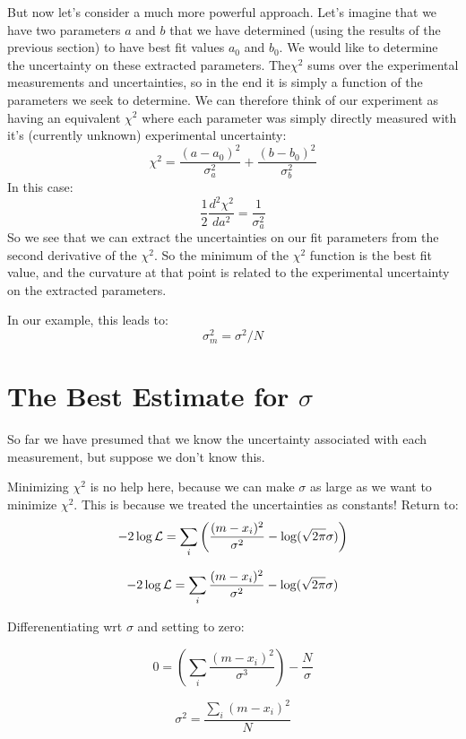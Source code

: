 \documentclass[12pt]{article}
\begin{document}
But now let's consider a much more powerful approach.  Let's imagine that we have two parameters $a$ and $b$ that we have determined (using the results of the previous section) to have best fit values $a_0$ and $b_0$.  We would like to determine the uncertainty on these extracted parameters.  The$\chi^2$ sums over the experimental measurements and uncertainties, so in the end it is simply a function of the parameters we seek to determine.   We can therefore think of our experiment as having an equivalent $\chi^2$ where each parameter was simply directly measured with it's (currently unknown)  experimental uncertainty:
\begin{displaymath}
\chi^2 = \frac{(a - a_0)^2}{\sigma_a^2} + \frac{(b - b_0)^2}{\sigma_b^2} 
\end{displaymath}
In this case:
\begin{displaymath}
\frac{1}{2} \frac{d^2 \chi^2}{da^2} = \frac{1}{\sigma_a^2}
\end{displaymath}
So we see that we can extract the uncertainties on our fit parameters from the second derivative of the $\chi^2$.  So the minimum of the $\chi^2$ function is the best fit value, and the curvature at that point is related to the experimental uncertainty on the extracted parameters.

In our example, this leads to:
\begin{displaymath}
\sigma_m^2 = \sigma^2/N
\end{displaymath}

\section{The Best Estimate for $\sigma$}

So far we have presumed that we know the uncertainty associated with each measurement, but suppose we don't know this.

Minimizing $\chi^2$ is no help here, because we can make $\sigma$ as large as we want to minimize $\chi^2$.  This is because we treated the uncertainties as constants!  Return to:
\begin{equation}
-2 \log {\cal L} = \sum_i \left( \frac{(m-x_i)^2}{\sigma^2} - \log(\sqrt{2\pi}\sigma)\right)
\end{equation}

\begin{equation}
-2 \log {\cal L} = \sum_i \frac{(m-x_i)^2}{\sigma^2} - \log(\sqrt{2\pi}\sigma)
\end{equation}

Differenentiating wrt $\sigma$ and setting to zero:

\begin{equation}
0 = \left( \sum_i \frac{(m-x_i)^2}{\sigma^3} \right)-\frac{N}{\sigma} 
\end{equation}

\begin{equation}
\sigma^2 = \frac{\sum_i (m-x_i)^2}{N} 
\end{equation}
\end{document}
